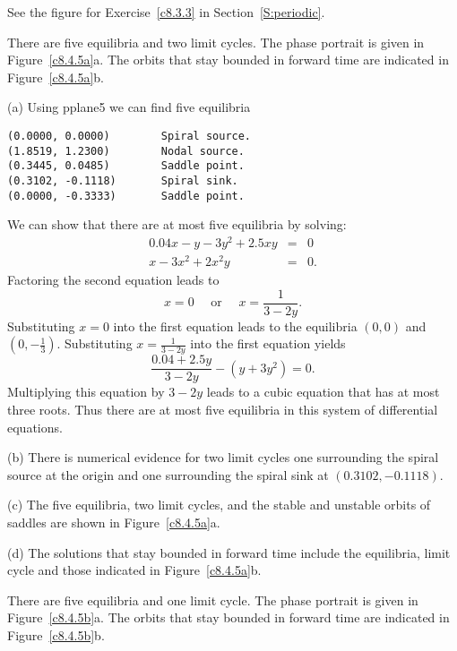 \documentclass{ximera}
\begin{document}
  See the figure for Exercise~\ref{c8.3.3} in
Section~\ref{S:periodic}.

\ans There are five equilibria and two limit cycles.  The phase portrait is
given in Figure~\ref{c8.4.5a}a.  The orbits that stay bounded in
forward time are indicated in Figure~\ref{c8.4.5a}b.

\soln (a)  Using {\sf pplane5} we can find five equilibria
\begin{verbatim}
(0.0000, 0.0000)        Spiral source.           
(1.8519, 1.2300)        Nodal source.            
(0.3445, 0.0485)        Saddle point.            
(0.3102, -0.1118)       Spiral sink.             
(0.0000, -0.3333)       Saddle point.            
\end{verbatim}
We can show that there are at most five equilibria by solving:
\begin{eqnarray*}
0.04x - y - 3y^2 + 2.5xy & = & 0\\
x - 3x^2 + 2x^2y & = & 0.
\end{eqnarray*}  
Factoring the second equation leads to 
\[
x=0 \quad \mbox{ or } \quad x = \frac{1}{3-2y}.
\]
Substituting $x=0$ into the first equation leads to the equilibria
$(0,0)$ and $(0,-\frac{1}{3})$. Substituting $x = \frac{1}{3-2y}$ into the
first equation yields
\[
\frac{0.04+2.5y}{3-2y} -(y+3y^2)=0.
\]
Multiplying this equation by $3-2y$ leads to a cubic equation that has at most
three roots.  Thus there are at most five equilibria in this system of
differential equations.

\noindent (b) There is numerical evidence for two limit cycles
one surrounding the spiral source at the origin and one surrounding the
spiral sink at $(0.3102, -0.1118)$.

\noindent (c)  The five equilibria, two limit cycles, and the stable and
unstable orbits of saddles are shown in Figure~\ref{c8.4.5a}a.

\noindent (d)  The solutions that stay bounded in forward time include the
equilibria, limit cycle and those indicated in Figure~\ref{c8.4.5a}b.

\begin{figure}[htb]
                       \centerline{%
			}
\end{figure}




\ans There are five equilibria and one limit cycle.  The phase portrait is
given in Figure~\ref{c8.4.5b}a.  The orbits that stay bounded in forward time
are indicated in Figure~\ref{c8.4.5b}b.
\end{document}
